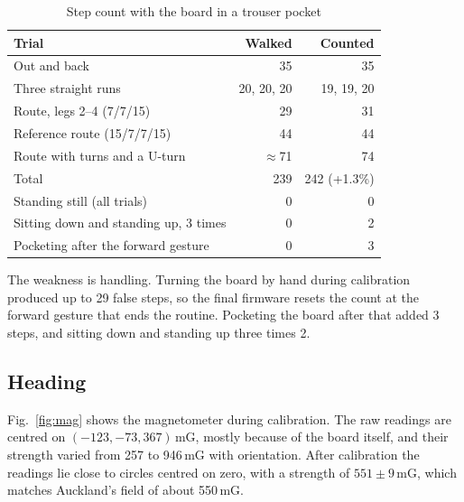 \documentclass[conference,a4paper]{IEEEtran}
\begin{document}
\begin{table}[!h]
\centering
\caption{Step count with the board in a trouser pocket}
\label{tab:steps}
\begin{tabular}{@{}lrr@{}}
\toprule
Trial & Walked & Counted \\
\midrule
Out and back & 35 & 35 \\
Three straight runs & 20, 20, 20 & 19, 19, 20 \\
Route, legs 2--4 (7/7/15) & 29 & 31 \\
Reference route (15/7/7/15) & 44 & 44 \\
Route with turns and a U-turn & $\approx$71 & 74 \\
\midrule
Total & 239 & 242 (+1.3\%) \\
\midrule
Standing still (all trials) & 0 & 0 \\
Sitting down and standing up, 3 times & 0 & 2 \\
Pocketing after the forward gesture & 0 & 3 \\
\bottomrule
\end{tabular}
\end{table}

The weakness is handling. Turning the board by hand during calibration produced up to 29 false
steps, so the final firmware resets the count at the forward gesture that ends the routine.
Pocketing the board after that added 3 steps, and sitting down and standing up three times 2.

\subsection{Heading}
Fig.~\ref{fig:mag} shows the magnetometer during calibration. The raw readings are centred on
$(-123,-73,367)$\,mG, mostly because of the board itself, and their strength varied from 257 to
946\,mG with orientation. After calibration the readings lie close to circles centred on zero,
with a strength of $551\pm9$\,mG, which matches Auckland's field of about 550\,mG.
\end{document}
